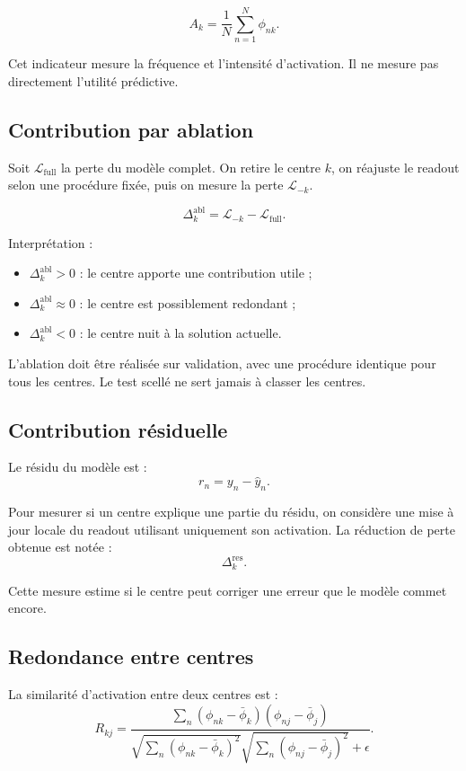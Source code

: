 \documentclass[11pt,a4paper]{article}
\begin{document}
\[
A_k=\frac{1}{N}\sum_{n=1}^{N}\phi_{nk}.
\]

Cet indicateur mesure la fréquence et l'intensité d'activation.
Il ne mesure pas directement l'utilité prédictive.

\subsection{Contribution par ablation}

Soit \(\mathcal{L}_{\mathrm{full}}\) la perte du modèle complet.
On retire le centre \(k\), on réajuste le readout selon une procédure
fixée, puis on mesure la perte \(\mathcal{L}_{-k}\).

\[
\Delta_k^{\mathrm{abl}}
=
\mathcal{L}_{-k}-\mathcal{L}_{\mathrm{full}}.
\]

Interprétation :
\begin{itemize}
  \item \(\Delta_k^{\mathrm{abl}}>0\) : le centre apporte une contribution utile ;
  \item \(\Delta_k^{\mathrm{abl}}\approx0\) : le centre est possiblement redondant ;
  \item \(\Delta_k^{\mathrm{abl}}<0\) : le centre nuit à la solution actuelle.
\end{itemize}

L'ablation doit être réalisée sur validation, avec une procédure identique
pour tous les centres. Le test scellé ne sert jamais à classer les centres.

\subsection{Contribution résiduelle}

Le résidu du modèle est :
\[
r_n=y_n-\hat y_n.
\]

Pour mesurer si un centre explique une partie du résidu, on considère
une mise à jour locale du readout utilisant uniquement son activation.
La réduction de perte obtenue est notée :
\[
\Delta_k^{\mathrm{res}}.
\]

Cette mesure estime si le centre peut corriger une erreur que le modèle
commet encore.

\subsection{Redondance entre centres}

La similarité d'activation entre deux centres est :
\[
R_{kj}
=
\frac{
\sum_n(\phi_{nk}-\bar\phi_k)(\phi_{nj}-\bar\phi_j)
}{
\sqrt{\sum_n(\phi_{nk}-\bar\phi_k)^2}
\sqrt{\sum_n(\phi_{nj}-\bar\phi_j)^2}
+\epsilon
}.
\]
\end{document}
